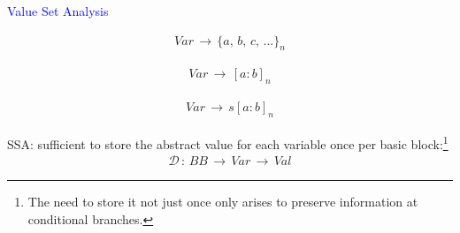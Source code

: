 \begin{frame}[fragile]{\textcolor{blue}{Value Set Analysis}}


\underline{}
\begin{align*}
Var \,\rightarrow\,\{a,\,b,\,c,\,...\}_n
\end{align*}

\underline{}
\begin{align*}
Var \,\rightarrow\, [a:b]_n
\end{align*}

\underline{}
\begin{align*}
Var \,\rightarrow\,s[a:b]_n
\end{align*}

\vspace{1.0cm}

SSA: sufficient to store the {\color{blue}abstract value for each variable once per basic block}:\footnote{The need to store it not just once only arises to preserve information at conditional branches.}
\begin{align*}
\mathcal{D}\,:\, BB \,\rightarrow\, Var \, \rightarrow\, Val
\end{align*}

\end{frame}

